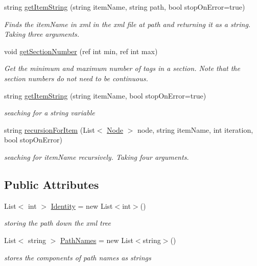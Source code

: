 \begin{DoxyCompactItemize}
string \mbox{\hyperlink{class_file_information_a39d5e80c0a0fd1eb49b76448294ba646}{get\+Item\+String}} (string item\+Name, string path, bool stop\+On\+Error=true)
\begin{DoxyCompactList}\small\item\em Finds the item\+Name in xml in the xml file at path and returning it as a string. Taking three arguments. \end{DoxyCompactList}\item 
void \mbox{\hyperlink{class_file_information_ae8fbc8bfb8316ca12118e69040172ac5}{get\+Section\+Number}} (ref int min, ref int max)
\begin{DoxyCompactList}\small\item\em Get the minimum and maximum number of tags in a section. Note that the section numbers do not need to be continuous. \end{DoxyCompactList}\item 
string \mbox{\hyperlink{class_file_information_abcfae5498145c9496138ed74aaedbdd5}{get\+Item\+String}} (string item\+Name, bool stop\+On\+Error=true)
\begin{DoxyCompactList}\small\item\em seaching for a string variable \end{DoxyCompactList}\item 
string \mbox{\hyperlink{class_file_information_a130927de30209803fd7e1c2ab7c84b69}{recursion\+For\+Item}} (List$<$ \mbox{\hyperlink{class_animal_change_1_1_node}{Node}} $>$ node, string item\+Name, int iteration, bool stop\+On\+Error)
\begin{DoxyCompactList}\small\item\em seaching for item\+Name recursively. Taking four arguments. \end{DoxyCompactList}\end{DoxyCompactItemize}
\subsection*{Public Attributes}
\begin{DoxyCompactItemize}
\item 
\mbox{\label{class_file_information_af9646342729b54469438752af5793d3b}} 
List$<$ int $>$ \mbox{\hyperlink{class_file_information_af9646342729b54469438752af5793d3b}{Identity}} = new List$<$int$>$()
\begin{DoxyCompactList}\small\item\em storing the path down the xml tree \end{DoxyCompactList}\item 
\mbox{\label{class_file_information_ab4b5c2a04bb90cbdb9b9e7fe1320ce88}} 
List$<$ string $>$ \mbox{\hyperlink{class_file_information_ab4b5c2a04bb90cbdb9b9e7fe1320ce88}{Path\+Names}} = new List$<$string$>$()
\begin{DoxyCompactList}\small\item\em stores the components of path names as strings \end{DoxyCompactList}\end{DoxyCompactItemize}


